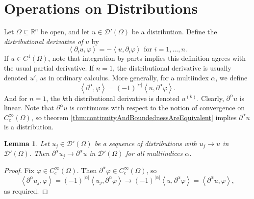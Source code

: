 \documentclass{book}
\newcommand{\scrD}{\mathscr{D}}
\newcommand{\bbR}{\mathbb{R}}
\renewcommand{\phi}{\varphi}
\newcommand{\abs}[1]{\left\lvert {#1} \right\rvert}
\newcommand{\angles}[1]{\left\langle {#1} \right\rangle}
\newtheorem{lemma}[theorem]{Lemma}
\theoremstyle{definition}
\theoremstyle{remark}
\numberwithin{equation}{chapter}
\begin{document}
\section{Operations on Distributions}
Let $\Omega \subseteq \bbR^n$ be open, and let $u \in \scrD'(\Omega)$ be a distribution. Define the \textit{distributional derivative of} $u$ by 
\begin{equation}
    \angles{ \partial_i u, \phi } = - \angles{ u,\partial_i\phi } \text{ for } i=1,\dots,n.
\end{equation}
If $u \in C^1(\Omega)$, note that integration by parts implies this definition agrees with the usual partial derivative. If $n=1$, the distributional derivative is usually denoted $u'$, as in ordinary calculus. More generally, for a multiindex $\alpha$, we define 
\begin{equation}
    \angles{ \partial^\alpha,\phi } = (-1)^{\abs{\alpha}} \angles{ u,\partial^\alpha \phi }.
\end{equation}
And for $n=1$, the $k$th distributional derivative is denoted $u^{(k)}$. Clearly, $\partial^\alpha u$ is linear. Note that $\partial^\alpha u$ is continuous with respect to the notion of convergence on $C_c^\infty(\Omega)$, so theorem \ref{thm:continuityAndBoundednessAreEquivalent} implies $\partial^\alpha u$ is a distribution.
\begin{lemma}
    Let $u_j \in \scrD'(\Omega)$ be a sequence of distributions with $u_j \rightarrow u$ in $\scrD'(\Omega)$. Then $\partial^\alpha u_j \rightarrow \partial^\alpha u$ in $\scrD'(\Omega)$ for all multiindices $\alpha$.
\end{lemma}
\begin{proof}
    Fix $\phi \in C_c^\infty(\Omega)$. Then $\partial^\alpha \phi \in C_c^\infty(\Omega)$, so 
    \begin{equation}
        \angles{ \partial^\alpha u_j, \phi } = (-1)^{\abs{\alpha}} \angles{ u_j, \partial^\alpha \phi }
                                             \rightarrow (-1)^{\abs{\alpha}} \angles{ u, \partial^\alpha \phi }
                                             = \angles{ \partial^\alpha u, \phi },
    \end{equation}
    as required.
\end{proof}
\end{document}
